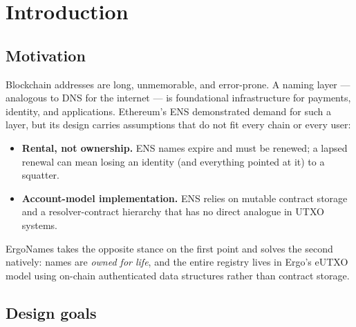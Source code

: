 \documentclass[11pt]{article}
\begin{document}
\section{Introduction}

\subsection{Motivation}

Blockchain addresses are long, unmemorable, and error-prone. A naming layer
--- analogous to DNS for the internet --- is foundational infrastructure for
payments, identity, and applications. Ethereum's ENS demonstrated demand for
such a layer, but its design carries assumptions that do not fit every chain
or every user:

\begin{itemize}
  \item \textbf{Rental, not ownership.} ENS names expire and must be renewed;
        a lapsed renewal can mean losing an identity (and everything pointed
        at it) to a squatter.
  \item \textbf{Account-model implementation.} ENS relies on mutable contract
        storage and a resolver-contract hierarchy that has no direct analogue
        in UTXO systems.
\end{itemize}

ErgoNames takes the opposite stance on the first point and solves the second
natively: names are \emph{owned for life}, and the entire registry lives in
Ergo's eUTXO model using on-chain authenticated data structures rather than
contract storage.

\subsection{Design goals}
\end{document}
